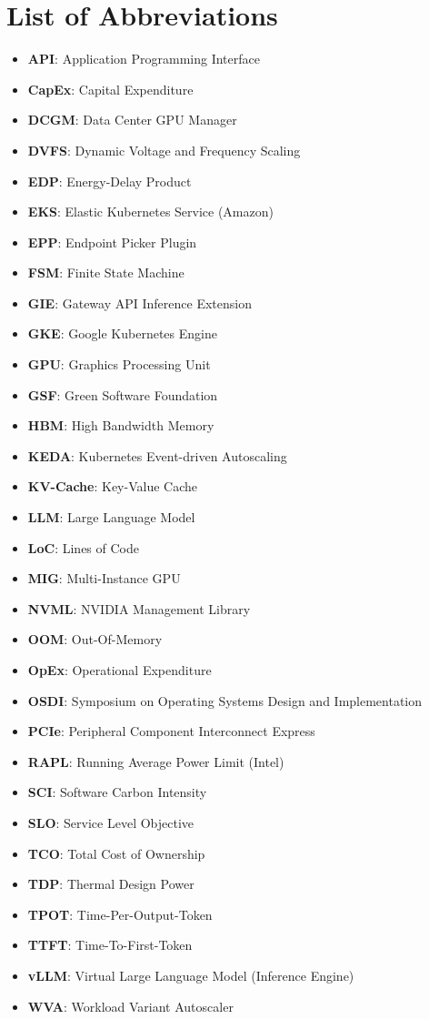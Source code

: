 \documentclass[12pt,a4paper,oneside]{report}
\begin{document}
\chapter*{List of Abbreviations}
\begin{itemize}
    \setlength\itemsep{0em}
    \item \textbf{API}: Application Programming Interface
    \item \textbf{CapEx}: Capital Expenditure
    \item \textbf{DCGM}: Data Center GPU Manager
    \item \textbf{DVFS}: Dynamic Voltage and Frequency Scaling
    \item \textbf{EDP}: Energy-Delay Product
    \item \textbf{EKS}: Elastic Kubernetes Service (Amazon)
    \item \textbf{EPP}: Endpoint Picker Plugin
    \item \textbf{FSM}: Finite State Machine
    \item \textbf{GIE}: Gateway API Inference Extension
    \item \textbf{GKE}: Google Kubernetes Engine
    \item \textbf{GPU}: Graphics Processing Unit
    \item \textbf{GSF}: Green Software Foundation
    \item \textbf{HBM}: High Bandwidth Memory
    \item \textbf{KEDA}: Kubernetes Event-driven Autoscaling
    \item \textbf{KV-Cache}: Key-Value Cache
    \item \textbf{LLM}: Large Language Model
    \item \textbf{LoC}: Lines of Code
    \item \textbf{MIG}: Multi-Instance GPU
    \item \textbf{NVML}: NVIDIA Management Library
    \item \textbf{OOM}: Out-Of-Memory
    \item \textbf{OpEx}: Operational Expenditure
    \item \textbf{OSDI}: Symposium on Operating Systems Design and Implementation
    \item \textbf{PCIe}: Peripheral Component Interconnect Express
    \item \textbf{RAPL}: Running Average Power Limit (Intel)
    \item \textbf{SCI}: Software Carbon Intensity
    \item \textbf{SLO}: Service Level Objective
    \item \textbf{TCO}: Total Cost of Ownership
    \item \textbf{TDP}: Thermal Design Power
    \item \textbf{TPOT}: Time-Per-Output-Token
    \item \textbf{TTFT}: Time-To-First-Token
    \item \textbf{vLLM}: Virtual Large Language Model (Inference Engine)
    \item \textbf{WVA}: Workload Variant Autoscaler
\end{itemize}
\end{document}
